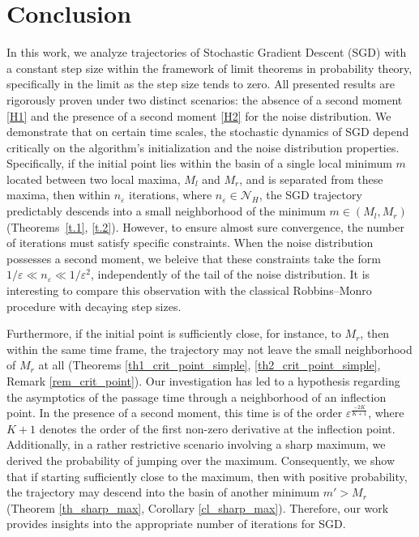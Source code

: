 \documentclass{article}
\theoremstyle{plain}
\theoremstyle{definition}
\theoremstyle{remark}
\begin{document}
\section{Conclusion} 
In this work, we analyze trajectories of Stochastic Gradient Descent (SGD) with a constant step size within the framework of limit theorems in probability theory, specifically in the limit as the step size tends to zero.  All presented results are rigorously proven under two distinct scenarios: the absence of a second moment \eqref{H1} and the presence of a second moment \eqref{H2} for the noise distribution. We demonstrate that on certain time scales, the stochastic dynamics of SGD depend critically on the algorithm's initialization and the noise distribution properties. Specifically, if the initial point lies within the basin of a single local minimum $m$ located between two local maxima, $M_{l}$ and $M_r$, and is separated from these maxima, then within $n_{\varepsilon}$ iterations, where $n_{\varepsilon} \in \mathcal{N}_{H}$, the SGD trajectory predictably descends into a small neighborhood of the minimum $m \in \left(M_{l}, M_r\right)$ (Theorems~\ref{t.1}, \ref{t.2}).
However, to ensure almost sure convergence, the number of iterations must satisfy specific constraints. When the noise distribution possesses a second moment, we beleive that these constraints take the form $1/\varepsilon \ll n_{\varepsilon} \ll 1/\varepsilon^2$, independently of the tail of the noise distribution. It is interesting to compare this observation with the classical Robbins--Monro procedure with decaying step sizes.

Furthermore, if the initial point is sufficiently close, for instance, to $M_r$, then within the same time frame, the trajectory may not leave the small neighborhood of $M_r$ at all (Theorems \ref{th1_crit_point_simple}, \ref{th2_crit_point_simple}, Remark \ref{rem_crit_point}). 
Our investigation has led to a hypothesis regarding the asymptotics of the passage time through a neighborhood of an inflection point. In the presence of a second moment, this time is of the order $\varepsilon^{\frac{-2K}{K+1}}$, where $K+1$ denotes the order of the first non-zero derivative at the inflection point. Additionally, in a rather restrictive scenario involving a sharp maximum, we derived the probability of jumping over the maximum. Consequently, we show that if starting sufficiently close to the maximum, then with positive probability, the trajectory may descend into the basin of another minimum $m' > M_r$ (Theorem \ref{th_sharp_max}, Corollary \ref{cl_sharp_max}).  Therefore, our work provides insights into the appropriate number of iterations for  SGD.
\end{document}
